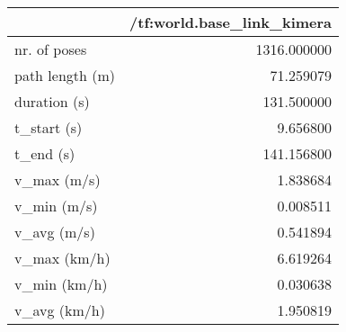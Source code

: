 \begin{tabular}{lr}
\toprule
{} &  /tf:world.base\_link\_kimera \\
\midrule
nr. of poses    &                 1316.000000 \\
path length (m) &                   71.259079 \\
duration (s)    &                  131.500000 \\
t\_start (s)     &                    9.656800 \\
t\_end (s)       &                  141.156800 \\
v\_max (m/s)     &                    1.838684 \\
v\_min (m/s)     &                    0.008511 \\
v\_avg (m/s)     &                    0.541894 \\
v\_max (km/h)    &                    6.619264 \\
v\_min (km/h)    &                    0.030638 \\
v\_avg (km/h)    &                    1.950819 \\
\bottomrule
\end{tabular}
